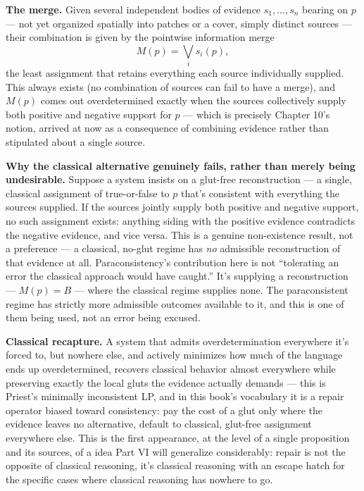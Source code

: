 \textbf{The merge.} Given several independent bodies of evidence
\(s_1, \dots, s_n\) bearing on \(p\) --- not yet organized spatially into
patches or a cover, simply distinct sources --- their combination is given
by the pointwise information merge
\[M(p) = \bigvee_i s_i(p),\]
the least assignment that retains everything each source individually
supplied. This always exists (no combination of sources can fail to have
a merge), and \(M(p)\) comes out overdetermined exactly when the sources
collectively supply both positive and negative support for \(p\) --- which
is precisely Chapter 10's notion, arrived at now as a consequence of
combining evidence rather than stipulated about a single source.

\textbf{Why the classical alternative genuinely fails, rather than merely
being undesirable.} Suppose a system insists on a glut-free
reconstruction --- a single, classical assignment of true-or-false to \(p\)
that's consistent with everything the sources supplied. If the sources
jointly supply both positive and negative support, no such assignment
exists: anything siding with the positive evidence contradicts the
negative evidence, and vice versa. This is a genuine non-existence
result, not a preference --- a classical, no-glut regime has \emph{no}
admissible reconstruction of that evidence at all. Paraconsistency's
contribution here is not ``tolerating an error the classical approach
would have caught.'' It's supplying a reconstruction --- \(M(p) = B\) --- where
the classical regime supplies none. The paraconsistent regime has
strictly more admissible outcomes available to it, and this is one of
them being used, not an error being excused.

\textbf{Classical recapture.} A system that admits overdetermination
everywhere it's forced to, but nowhere else, and actively minimizes how
much of the language ends up overdetermined, recovers classical behavior
almost everywhere while preserving exactly the local gluts the evidence
actually demands --- this is Priest's minimally inconsistent LP, and in
this book's vocabulary it is a repair operator biased toward
consistency: pay the cost of a glut only where the evidence leaves no
alternative, default to classical, glut-free assignment everywhere else.
This is the first appearance, at the level of a single proposition and
its sources, of a idea Part VI will generalize considerably: repair is
not the opposite of classical reasoning, it's classical reasoning with an
escape hatch for the specific cases where classical reasoning has
nowhere to go.

